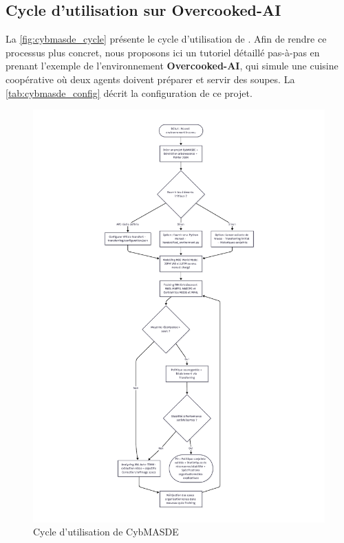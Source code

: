 \subsection{Cycle d'utilisation sur Overcooked-AI}

La \autoref{fig:cybmasde_cycle} présente le cycle d’utilisation de .
Afin de rendre ce processus plus concret, nous proposons ici un tutoriel détaillé pas-à-pas en prenant l’exemple de l’environnement \textbf{Overcooked-AI}, qui simule une cuisine coopérative où deux agents doivent préparer et servir des soupes. La \autoref{tab:cybmasde_config} décrit la configuration de ce projet.

\begin{figure}
  \centering
  \includegraphics[trim={5cm 1cm 5cm 1cm},clip,height=\textheight]{figures/CybMASDE_user_flowchart.pdf}
  \caption{Cycle d'utilisation de CybMASDE}
  \label{fig:cybmasde_cycle}
\end{figure}

